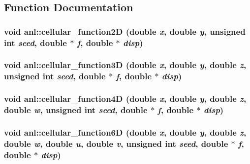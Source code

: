 \subsection{Function Documentation}
\hypertarget{namespaceanl_a19e0b5ad2aac87e007cd0979ca0320d0}{
\subsubsection[{cellular\_\-function2D}]{\setlength{\rightskip}{0pt plus 5cm}void anl::cellular\_\-function2D (double {\em x}, \/  double {\em y}, \/  unsigned int {\em seed}, \/  double $\ast$ {\em f}, \/  double $\ast$ {\em disp})}}
\label{namespaceanl_a19e0b5ad2aac87e007cd0979ca0320d0}
\hypertarget{namespaceanl_a6dba94663a355d7422d19c16382ff415}{
\subsubsection[{cellular\_\-function3D}]{\setlength{\rightskip}{0pt plus 5cm}void anl::cellular\_\-function3D (double {\em x}, \/  double {\em y}, \/  double {\em z}, \/  unsigned int {\em seed}, \/  double $\ast$ {\em f}, \/  double $\ast$ {\em disp})}}
\label{namespaceanl_a6dba94663a355d7422d19c16382ff415}
\hypertarget{namespaceanl_a434301b07bb093858c319d4cfb3c7a06}{
\subsubsection[{cellular\_\-function4D}]{\setlength{\rightskip}{0pt plus 5cm}void anl::cellular\_\-function4D (double {\em x}, \/  double {\em y}, \/  double {\em z}, \/  double {\em w}, \/  unsigned int {\em seed}, \/  double $\ast$ {\em f}, \/  double $\ast$ {\em disp})}}
\label{namespaceanl_a434301b07bb093858c319d4cfb3c7a06}
\hypertarget{namespaceanl_a6dff2151ef31b675e2f7571fec43457f}{
\subsubsection[{cellular\_\-function6D}]{\setlength{\rightskip}{0pt plus 5cm}void anl::cellular\_\-function6D (double {\em x}, \/  double {\em y}, \/  double {\em z}, \/  double {\em w}, \/  double {\em u}, \/  double {\em v}, \/  unsigned int {\em seed}, \/  double $\ast$ {\em f}, \/  double $\ast$ {\em disp})}}
